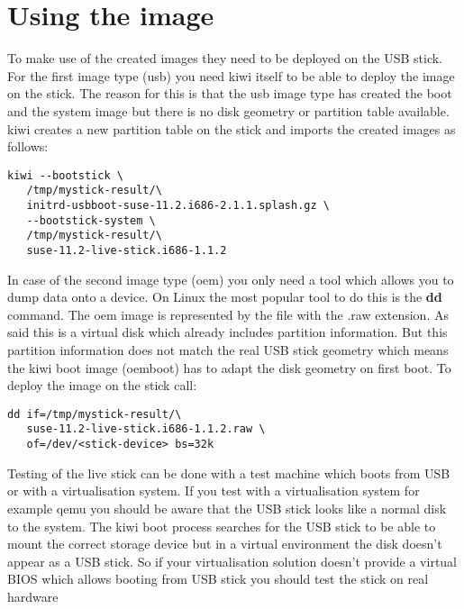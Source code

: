 \section{Using the image}

To make use of the created images they need to be deployed on the
USB stick. For the first image type (usb) you need kiwi itself to
be able to deploy the image on the stick. The reason for this is
that the usb image type has created the boot and the system image
but there is no disk geometry or partition table available. kiwi
creates a new partition table on the stick and imports the created
images as follows:

\begin{Command}{13cm}
\begin{verbatim}
kiwi --bootstick \
   /tmp/mystick-result/\
   initrd-usbboot-suse-11.2.i686-2.1.1.splash.gz \
   --bootstick-system \
   /tmp/mystick-result/\
   suse-11.2-live-stick.i686-1.1.2
\end{verbatim}
\end{Command}

In case of the second image type (oem) you only need a tool which allows
you to dump data onto a device. On Linux the most popular tool to do this
is the \textbf{dd} command. The oem image is represented by the file
with the .raw extension. As said this is a virtual disk which already
includes partition information. But this partition information does
not match the real USB stick geometry which means the kiwi boot image
(oemboot) has to adapt the disk geometry on first boot. To deploy the
image on the stick call:

\begin{Command}{13cm}
\begin{verbatim}
dd if=/tmp/mystick-result/\
   suse-11.2-live-stick.i686-1.1.2.raw \
   of=/dev/<stick-device> bs=32k
\end{verbatim}
\end{Command}

Testing of the live stick can be done with a test machine which boots from
USB or with a virtualisation system. If you test with a virtualisation
system for example qemu you should be aware that the USB stick looks like
a normal disk to the system. The kiwi boot process searches for the USB
stick to be able to mount the correct storage device but in a virtual
environment the disk doesn't appear as a USB stick. So if your
virtualisation solution doesn't provide a virtual BIOS which allows booting
from USB stick you should test the stick on real hardware

